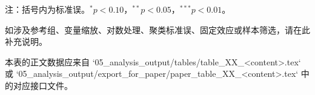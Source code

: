 \begin{tablenotes}[flushleft]
\footnotesize
\item 注：括号内为标准误。$^{*} p<0.10$，$^{**} p<0.05$，$^{***} p<0.01$。
\item 如涉及参考组、变量缩放、对数处理、聚类标准误、固定效应或样本筛选，请在此补充说明。
\item 本表的正文数据应来自 `05_analysis_output/tables/table_XX_<content>.tex` 或 `05_analysis_output/export_for_paper/paper_table_XX_<content>.tex` 中的对应接口文件。
\end{tablenotes}
